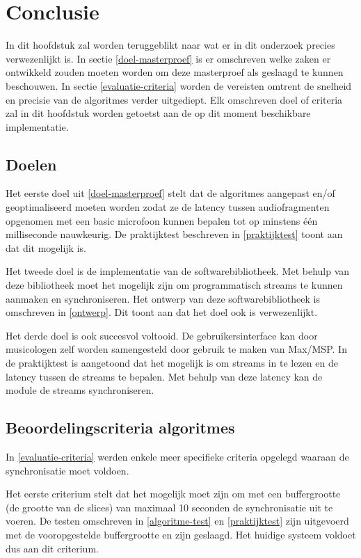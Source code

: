 \chapter{Conclusie}

In dit hoofdstuk zal worden teruggeblikt naar wat er in dit onderzoek precies verwezenlijkt is. In sectie \ref{doel-masterproef} is er omschreven welke zaken er ontwikkeld zouden moeten worden om deze masterproef als geslaagd te kunnen beschouwen. In sectie \ref{evaluatie-criteria} worden de vereisten omtrent de snelheid en precisie van de algoritmes verder uitgediept. Elk omschreven doel of criteria zal in dit hoofdstuk worden getoetst aan de op dit moment beschikbare implementatie.

\section{Doelen}

Het eerste doel uit \ref{doel-masterproef} stelt dat de algoritmes aangepast en/of geoptimaliseerd moeten worden zodat ze de latency tussen audiofragmenten opgenomen met een basic microfoon kunnen bepalen tot op minstens één milliseconde nauwkeurig. De praktijktest beschreven in \ref{praktijktest} toont aan dat dit mogelijk is.

Het tweede doel is de implementatie van de softwarebibliotheek. Met behulp van deze bibliotheek moet het mogelijk zijn om programmatisch streams te kunnen aanmaken en synchroniseren. Het ontwerp van deze softwarebibliotheek is omschreven in \ref{ontwerp}. Dit toont aan dat het doel ook is verwezenlijkt.

Het derde doel is ook succesvol voltooid. De gebruikersinterface kan door musicologen zelf worden samengesteld door gebruik te maken van Max/MSP. In de praktijktest is aangetoond dat het mogelijk is om streams in te lezen en de latency tussen de streams te bepalen. Met behulp van deze latency kan de module de streams synchroniseren.

\section{Beoordelingscriteria algoritmes}

In \ref{evaluatie-criteria} werden enkele meer specifieke criteria opgelegd waaraan de synchronisatie moet voldoen.

Het eerste criterium stelt dat het mogelijk moet zijn om met een buffergrootte (de grootte van de slices) van maximaal 10 seconden de synchronisatie uit te voeren. De testen omschreven in \ref{algoritme-test} en \ref{praktijktest} zijn uitgevoerd met de vooropgestelde buffergrootte en zijn geslaagd. Het huidige systeem voldoet dus aan dit criterium.

